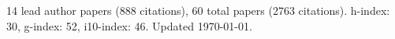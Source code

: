 14 lead author papers (888 citations),
60 total papers (2763 citations).\newline
h-index: 30, g-index: 52, i10-index: 46. Updated \today.